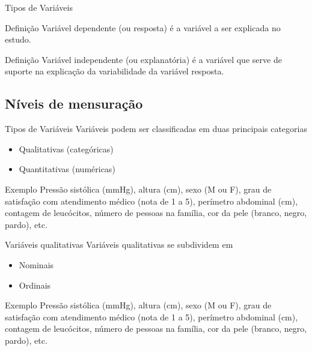 \documentclass{beamer}
\begin{document}
\begin{frame}{Tipos de Variáveis}
  \begin{block}{Definição}
    Variável \alert{dependente} (ou resposta) é a variável a ser
    explicada no estudo.
  \end{block}
  \begin{block}{Definição}
    Variável \alert{independente} (ou explanatória) é a variável que
    serve de suporte na explicação da variabilidade da variável
    resposta.
  \end{block}
\end{frame}

\subsection{Níveis de mensuração}

\begin{frame}{Tipos de Variáveis}
Variáveis podem ser classificadas em duas principais categorias
  \begin{itemize}
  \item Qualitativas (categóricas)
  \item Quantitativas (numéricas)
  \end{itemize}
  \begin{exampleblock}{Exemplo}
    Pressão sistólica (mmHg), altura (cm), sexo (M ou F), grau de
    satisfação com atendimento médico (nota de 1 a 5), perímetro
    abdominal (cm), contagem de leucócitos, número de pessoas na
    família, cor da pele (branco, negro, pardo), etc.
  \end{exampleblock}
\end{frame}

\begin{frame}{Variáveis qualitativas}
Variáveis qualitativas se subdividem em
  \begin{itemize}
  \item<1-2> Nominais

  \item<3-4> Ordinais
  \end{itemize}


  \begin{exampleblock}{Exemplo}
    Pressão sistólica (mmHg), altura (cm), \alert{sexo (M ou
      F)}, \alert{grau de satisfação com atendimento médico
      (nota de 1 a 5)}, perímetro abdominal (cm), contagem de
    leucócitos, número de pessoas na família, \alert{cor da
      pele (branco, negro, pardo)}, etc.
  \end{exampleblock}
\end{frame}
\end{document}
